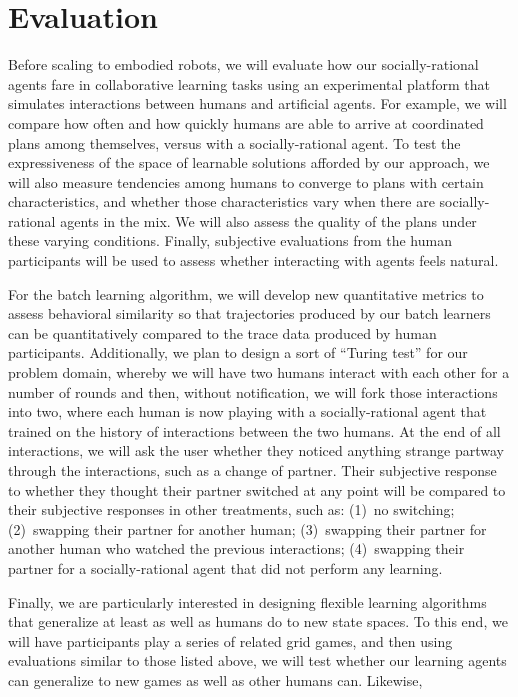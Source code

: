 
\section{Evaluation}

Before scaling to embodied robots,
we will evaluate how our socially-rational agents fare in
collaborative learning tasks using an experimental platform that
simulates interactions between humans and artificial agents.  For
example, we will compare how often and how quickly humans are able to
arrive at coordinated plans among themselves, versus with a
socially-rational agent.  To test the expressiveness of the space of
learnable solutions afforded by our approach, we will also measure
tendencies among humans to converge to plans with certain
characteristics, and whether those characteristics vary when there are
socially-rational agents in the mix.  We will also assess the quality of the
plans under these varying conditions.  Finally, subjective evaluations
from the human participants will be used to assess whether interacting
with agents feels natural.

For the batch learning algorithm, we will develop new quantitative
metrics to assess behavioral similarity so that trajectories produced
by our batch learners can be quantitatively compared to the trace data
produced by human participants.  Additionally, we plan to design a
sort of ``Turing test'' for our problem domain, whereby we will have
two humans interact with each other for a number of rounds and then,
without notification, we will fork those interactions into two, where
each human is now playing with a socially-rational agent that trained
on the history of interactions between the two humans.  At the end of
all interactions, we will ask the user whether they noticed anything
strange partway through the interactions, such as a change of partner.
Their subjective response to whether they thought their partner
switched at any point will be compared to their subjective responses
in other treatments, such as: (1)~no switching; (2)~swapping their
partner for another human; (3)~swapping their partner for another
human who watched the previous interactions; (4)~swapping their
partner for a socially-rational agent that did not perform any
learning.

Finally, we are particularly interested in designing flexible learning
algorithms that generalize at least as well as humans do to new state
spaces.  To this end, we will have participants play a series of
related grid games, and then using evaluations similar to those listed
above, we will test whether our learning agents can generalize to new
games as well as other humans can.  Likewise,

